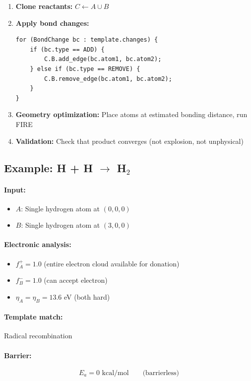 \documentclass[11pt]{article}
\begin{document}
\begin{enumerate}
\item \textbf{Clone reactants:} $C \leftarrow A \cup B$
\item \textbf{Apply bond changes:}
\begin{lstlisting}
for (BondChange bc : template.changes) {
    if (bc.type == ADD) {
        C.B.add_edge(bc.atom1, bc.atom2);
    } else if (bc.type == REMOVE) {
        C.B.remove_edge(bc.atom1, bc.atom2);
    }
}
\end{lstlisting}
\item \textbf{Geometry optimization:} Place atoms at estimated bonding distance, run FIRE
\item \textbf{Validation:} Check that product converges (not explosion, not unphysical)
\end{enumerate}

\subsection{Example: H + H $\to$ H$_2$}

\paragraph{Input:}
\begin{itemize}
\item $A$: Single hydrogen atom at $(0, 0, 0)$
\item $B$: Single hydrogen atom at $(3, 0, 0)$
\end{itemize}

\paragraph{Electronic analysis:}
\begin{itemize}
\item $f^+_A = 1.0$ (entire electron cloud available for donation)
\item $f^-_B = 1.0$ (can accept electron)
\item $\eta_A = \eta_B = 13.6$ eV (both hard)
\end{itemize}

\paragraph{Template match:} Radical recombination

\paragraph{Barrier:}
\begin{equation}
E_a = 0 \text{ kcal/mol} \qquad \text{(barrierless)}
\end{equation}
\end{document}
